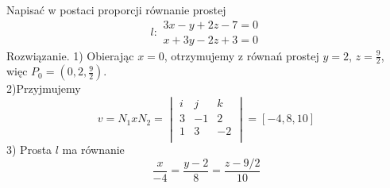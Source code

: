 \begin{przyklad}
Napisać w postaci proporcji równanie prostej
\begin{equation}
l:
\begin{matrix}
3x-y+2z-7=0\\
x+3y-2z+3=0
\end{matrix}
\nonumber
\end{equation}
Rozwiązanie. 1) Obierając $x=0$, otrzymujemy z równań prostej $y=2$, $z= \frac{9}{2}$,\\ więc $P_0=(0,2,\frac{9}{2})$.\\
2)Przyjmujemy
\begin{equation}
v=N_1xN_2=
\begin{vmatrix}
i & j & k \\
3 & -1 & 2 \\
1 & 3 & -2 \\
\end{vmatrix}
= [-4,8,10]
\end{equation}
3) Prosta $l$ ma równanie
\begin{equation}
\frac{x}{-4}=\frac{y-2}{8}=\frac{z-9/2}{10}
\end{equation}
\end{przyklad}